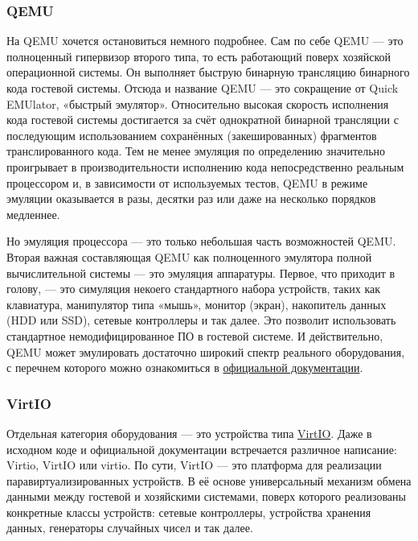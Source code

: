\documentclass[14pt, a4paper]{article}
\begin{document}
\subsubsection*{QEMU}

На QEMU хочется остановиться немного подробнее. Сам по себе QEMU — это полноценный
гипервизор второго типа, то есть работающий поверх хозяйской операционной системы. Он
выполняет быструю бинарную трансляцию бинарного кода гостевой системы. Отсюда и название
QEMU — это сокращение от Quick EMUlator, «быстрый эмулятор». Относительно высокая скорость
исполнения кода гостевой системы достигается за счёт однократной бинарной трансляции с
последующим использованием сохранённых (закешированных) фрагментов транслированного кода.
Тем не менее эмуляция по определению значительно проигрывает в производительности исполнению
кода непосредственно реальным процессором и, в зависимости от используемых тестов, QEMU в
режиме эмуляции оказывается в разы, десятки раз или даже на несколько порядков медленнее.

Но эмуляция процессора — это только небольшая часть возможностей QEMU. Вторая важная
составляющая QEMU как полноценного эмулятора полной вычислительной системы — это эмуляция
аппаратуры. Первое, что приходит в голову, — это симуляция некоего стандартного набора устройств,
таких как клавиатура, манипулятор типа «мышь», монитор (экран), накопитель данных (HDD или
SSD), сетевые контроллеры и так далее. Это позволит использовать стандартное
немодифицированное ПО в гостевой системе. И действительно, QEMU может эмулировать
достаточно широкий спектр реального оборудования, с перечнем которого можно ознакомиться в
\href{https://en.wikibooks.org/wiki/QEMU/Devices}{официальной документации}.

\subsubsection*{VirtIO}

Отдельная категория оборудования — это устройства типа \href{https://en.wikibooks.org/wiki/QEMU/Devices/Virtio}{VirtIO}. Даже в исходном коде и
официальной документации встречается различное написание: Virtio, VirtIO или virtio. По сути, VirtIO
— это платформа для реализации паравиртуализированных устройств. В её основе универсальный
механизм обмена данными между гостевой и хозяйскими системами, поверх которого реализованы
конкретные классы устройств: сетевые контроллеры, устройства хранения данных, генераторы
случайных чисел и так далее.
\end{document}
